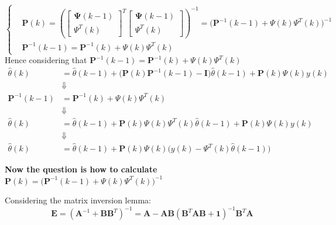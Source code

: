 \documentclass[12pt,a4paper,oneside]{book}
\begin{document}
\begin{onehalfspace}
\begin{equation}
	\left\{
	\begin{aligned}
		& \mathbf{P}(k) = \left(\begin{bmatrix} \mathbf{\Psi}(k-1) \\[6pt] 
		\Psi^T(k) \end{bmatrix}^T \begin{bmatrix} \mathbf{\Psi}(k-1) \\[6pt] 
		\Psi^T(k) \end{bmatrix} \right)^{-1} = 
		\Big(\mathbf{P}^{-1}(k-1)+\Psi(k)\Psi^T(k)\Big)^{-1}\\[6pt]
		& \mathbf{P}^{-1}(k-1) = \mathbf{P}^{-1}(k)+\Psi(k)\Psi^T(k)
	\end{aligned}\right.
\end{equation}
Hence considering that 
$\mathbf{P}^{-1}(k-1)=\mathbf{P}^{-1}(k)+\Psi(k)\Psi^T(k)$
\begin{equation*}
	\begin{aligned}
		\hat{\theta}(k) &= 
		\hat{\theta}(k-1)+\Big(\mathbf{P}(k)\mathbf{P}^{-1}(k-1)-\mathbf{I}\Big)\hat{\theta}(k-1)+\mathbf{P}(k)\Psi(k)y(k)
		 \\[6pt]
		& \Downarrow \\[6pt]
		\mathbf{P}^{-1}(k-1) &= \mathbf{P}^{-1}(k)+\Psi(k)\Psi^T(k) \\[6pt]
		& \Downarrow \\[6pt]
		\hat{\theta}(k) &= 
		\hat{\theta}(k-1)+\mathbf{P}(k)\Psi(k)\Psi^T(k)\hat{\theta}(k-1)+\mathbf{P}(k)\Psi(k)y(k)
		 \\[6pt]
		& \Downarrow \\[6pt]
		\hat{\theta}(k) &= \hat{\theta}(k-1)+\mathbf{P}(k)\Psi(k)\Big(y(k) 
		-\Psi^T(k)\hat{\theta}(k-1)\Big) 
	\end{aligned}
\end{equation*}

\noindent\textbf{Now the question is how to calculate} 
$\mathbf{P}(k)=\Big(\mathbf{P}^{-1}(k-1)+\Psi(k)\Psi^T(k)\Big)^{-1} $

Considering the matrix inversion lemma: 
\begin{equation}
	\mathbf{E}=\left( 
	\mathbf{A}^{-1}+\mathbf{B}\mathbf{B}^T\right)^{-1}=\mathbf{A}-\mathbf{A}\mathbf{B}\left(\mathbf{B}^T\mathbf{A}\mathbf{B}+
	 \mathbf{1}\right)^{-1}\mathbf{B}^T\mathbf{A}
\end{equation}


\end{onehalfspace}
\end{document}
